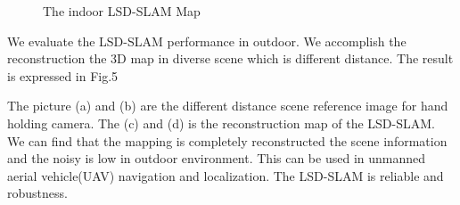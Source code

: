 \begin{figure}
          \hspace{0in}
     \caption{The indoor LSD-SLAM Map}
\end{figure}

\fi



\iffalse
We evaluate the LSD-SLAM performance in outdoor. We accomplish the reconstruction the 3D map in diverse scene which is different distance. The result is expressed in Fig.5

The picture (a) and (b) are the different distance scene reference image for hand holding camera. The (c) and (d) is the reconstruction map of the LSD-SLAM. We can find that the mapping is completely reconstructed the scene information and the noisy is low in outdoor environment. This can be used in unmanned aerial vehicle(UAV) navigation and localization. The LSD-SLAM is reliable and robustness.

